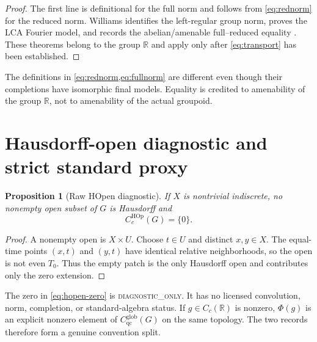 \documentclass[11pt]{article}
\newtheorem{proposition}[theorem]{Proposition}
\theoremstyle{definition}
\newcommand{\R}{\mathbb R}
\newcommand{\Cglob}{C_{\mathrm{qc}}^{\mathrm{glob}}}
\newcommand{\CHOp}{C_c^{\mathrm{HOp}}}
\newcommand{\Diag}{\textsc{diagnostic\_only}}
\begin{document}
\begin{proof}
The first line is definitional for the full norm and follows from
\cref{eq:rednorm} for the reduced norm.  Williams identifies the left-regular
group norm, proves the LCA Fourier model, and records the abelian/amenable
full--reduced equality \cite[Example~1.80, Proposition~3.1, Examples~7.9
and 7.11, and Theorem~7.13]{Williams2007}.  These theorems belong to the
group $\R$ and apply only after \cref{eq:transport} has been established.
\end{proof}

The definitions in \cref{eq:rednorm,eq:fullnorm} are different even though
their completions have isomorphic final models.  Equality is credited to
amenability of the group $\R$, not to amenability of the actual groupoid.

\section{Hausdorff-open diagnostic and strict standard proxy}
\label{sec:proxy}

\begin{proposition}[Raw HOpen diagnostic]
\label{prop:hopen}
If $X$ is nontrivial indiscrete, no nonempty open subset of $G$ is Hausdorff
and
\begin{equation}
 \CHOp(G)=\{0\}.
 \label{eq:hopen-zero}
\end{equation}
\end{proposition}

\begin{proof}
A nonempty open is $X\times U$.  Choose $t\in U$ and distinct $x,y\in X$.
The equal-time points $(x,t)$ and $(y,t)$ have identical relative
neighborhoods, so the open is not even $T_0$.  Thus the empty patch is the
only Hausdorff open and contributes only the zero extension.
\end{proof}

The zero in \cref{eq:hopen-zero} is \Diag.  It has no licensed convolution,
norm, completion, or standard-algebra status.  If $g\in C_c(\R)$ is nonzero,
$\Phi(g)$ is an explicit nonzero element of $\Cglob(G)$ on the same topology.
The two records therefore form a genuine convention split.
\end{document}
